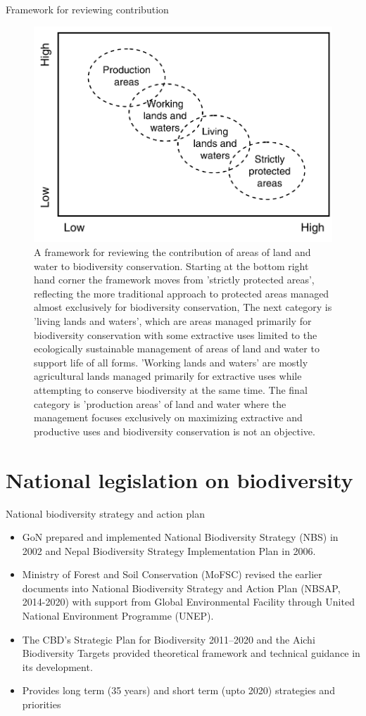 \documentclass[
  ignorenonframetext,
  aspectratio=169]{beamer}
\providecommand{\tightlist}{%
  \setlength{\itemsep}{0pt}\setlength{\parskip}{0pt}}
\begin{document}
\begin{frame}{Framework for reviewing contribution}
\protect\hypertarget{framework-for-reviewing-contribution}{}
\begin{figure}
\includegraphics[width=0.45\linewidth]{./../images/contribution_review} \caption{A framework for reviewing the contribution of areas of land and water to biodiversity conservation. Starting at the bottom right hand corner the framework moves from 'strictly protected areas', reflecting the more traditional approach to protected areas managed almost exclusively for biodiversity conservation, The next category is 'living lands and waters', which are areas managed primarily for biodiversity conservation with some extractive uses limited to the ecologically sustainable management of areas of land and water to support life of all forms. 'Working lands and waters' are mostly agricultural lands managed primarily for extractive uses while attempting to conserve biodiversity at the same time. The final category is 'production areas' of land and water where the management focuses exclusively on maximizing extractive and productive uses and biodiversity conservation is not an objective.}\label{fig:contribution-review}
\end{figure}
\end{frame}

\hypertarget{national-legislation-on-biodiversity}{%
\section{National legislation on
biodiversity}\label{national-legislation-on-biodiversity}}

\begin{frame}{National biodiversity strategy and action plan}
\protect\hypertarget{national-biodiversity-strategy-and-action-plan}{}
\begin{itemize}
\tightlist
\item
  GoN prepared and implemented National Biodiversity Strategy (NBS) in
  2002 and Nepal Biodiversity Strategy Implementation Plan in 2006.
\item
  Ministry of Forest and Soil Conservation (MoFSC) revised the earlier
  documents into National Biodiversity Strategy and Action Plan (NBSAP,
  2014-2020) with support from Global Environmental Facility through
  United National Environment Programme (UNEP).
\item
  The CBD's Strategic Plan for Biodiversity 2011--2020 and the Aichi
  Biodiversity Targets provided theoretical framework and technical
  guidance in its development.
\item
  Provides long term (35 years) and short term (upto 2020) strategies
  and priorities
\end{itemize}
\end{frame}
\end{document}
